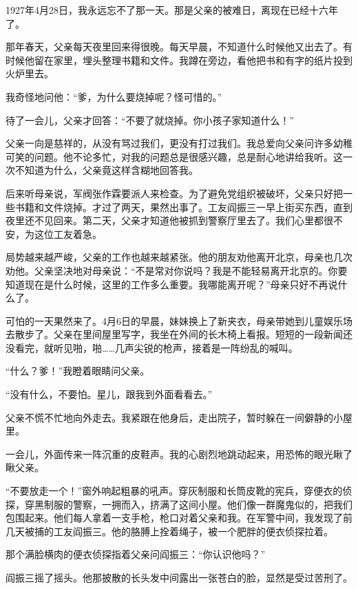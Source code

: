 \documentclass[12pt,UTF-8,openany]{ctexbook}
\begin{document}
\begin{large}
    
    1927年4月28日，我永远忘不了那一天。那是父亲的被难日，离现在已经十六年了。
    
    那年春天，父亲每天夜里回来得很晚。每天早晨，不知道什么时候他又出去了。有时候他留在家里，埋头整理书籍和文件。我蹲在旁边，看他把书和有字的纸片投到火炉里去。
    
    我奇怪地问他：“爹，为什么要烧掉呢？怪可惜的。”
    
    待了一会儿，父亲才回答：“不要了就烧掉。你小孩子家知道什么！”
    
    父亲一向是慈祥的，从没有骂过我们，更没有打过我们。我总爱向父亲问许多幼稚可笑的问题。他不论多忙，对我的问题总是很感兴趣，总是耐心地讲给我听。这一次不知道为什么，父亲竟这样含糊地回答我。
    
    后来听母亲说，军阀张作霖要派人来检查。为了避免党组织被破坏，父亲只好把一些书籍和文件烧掉。才过了两天，果然出事了。工友阎振三一早上街买东西，直到夜里还不见回来。第二天，父亲才知道他被抓到警察厅里去了。我们心里都很不安，为这位工友着急。
    
    局势越来越严峻，父亲的工作也越来越紧张。他的朋友劝他离开北京，母亲也几次劝他。父亲坚决地对母亲说：“不是常对你说吗？我是不能轻易离开北京的。你要知道现在是什么时候，这里的工作多么重要。我哪能离开呢？”母亲只好不再说什么了。
    
    可怕的一天果然来了。4月6日的早晨，妹妹换上了新夹衣，母亲带她到儿童娱乐场去散步了。父亲在里间屋里写字，我坐在外间的长木椅上看报。短短的一段新闻还没看完，就听见啪，啪……几声尖锐的枪声，接着是一阵纷乱的喊叫。
    
    “什么？爹！”我瞪着眼睛问父亲。
    
    “没有什么，不要怕。星儿，跟我到外面看看去。”
    
    父亲不慌不忙地向外走去。我紧跟在他身后，走出院子，暂时躲在一间僻静的小屋里。
    
    一会儿，外面传来一阵沉重的皮鞋声。我的心剧烈地跳动起来，用恐怖的眼光瞅了瞅父亲。
    
    “不要放走一个！”窗外响起粗暴的吼声。穿灰制服和长筒皮靴的宪兵，穿便衣的侦探，穿黑制服的警察，一拥而入，挤满了这间小屋。他们像一群魔鬼似的，把我们包围起来。他们每人拿着一支手枪，枪口对着父亲和我。在军警中间，我发现了前几天被捕的工友阎振三。他的胳膊上拴着绳子，被一个肥胖的便衣侦探拉着。
    
    那个满脸横肉的便衣侦探指着父亲问阎振三：“你认识他吗？”
    
    阎振三摇了摇头。他那披散的长头发中间露出一张苍白的脸，显然是受过苦刑了。
    

\end{large}
\end{document}
